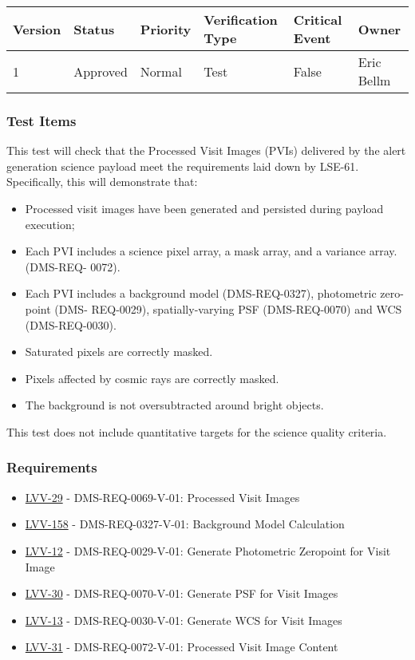 \begin{longtable}[]{@{}llllll@{}}
\toprule
Version & Status & Priority & Verification Type & Critical Event &
Owner\tabularnewline
\midrule
\endhead
1 & Approved & Normal & Test & False & Eric Bellm\tabularnewline
\bottomrule
\end{longtable}

\subsubsection{Test Items}\label{test-items-2}

This test will check that the Processed Visit Images (PVIs) delivered by
the alert generation science payload meet the requirements laid down by
LSE-61.\\
Specifically, this will demonstrate that:

\begin{itemize}
\tightlist
\item
  Processed visit images have been generated and persisted during
  payload execution;
\item
  Each PVI includes a science pixel array, a mask array, and a variance
  array. (DMS-REQ- 0072).
\item
  Each PVI includes a background model (DMS-REQ-0327), photometric
  zero-point (DMS- REQ-0029), spatially-varying PSF (DMS-REQ-0070) and
  WCS (DMS-REQ-0030).
\item
  Saturated pixels are correctly masked.
\item
  Pixels affected by cosmic rays are correctly masked.
\item
  The background is not oversubtracted around bright objects.
\end{itemize}

This test does not include quantitative targets for the science quality
criteria.

\subsubsection{Requirements}\label{requirements-2}

\begin{itemize}
\tightlist
\item
  \href{https://jira.lsstcorp.org/browse/LVV-29}{LVV-29} -
  DMS-REQ-0069-V-01: Processed Visit Images
\item
  \href{https://jira.lsstcorp.org/browse/LVV-158}{LVV-158} -
  DMS-REQ-0327-V-01: Background Model Calculation
\item
  \href{https://jira.lsstcorp.org/browse/LVV-12}{LVV-12} -
  DMS-REQ-0029-V-01: Generate Photometric Zeropoint for Visit Image
\item
  \href{https://jira.lsstcorp.org/browse/LVV-30}{LVV-30} -
  DMS-REQ-0070-V-01: Generate PSF for Visit Images
\item
  \href{https://jira.lsstcorp.org/browse/LVV-13}{LVV-13} -
  DMS-REQ-0030-V-01: Generate WCS for Visit Images
\item
  \href{https://jira.lsstcorp.org/browse/LVV-31}{LVV-31} -
  DMS-REQ-0072-V-01: Processed Visit Image Content
\end{itemize}


